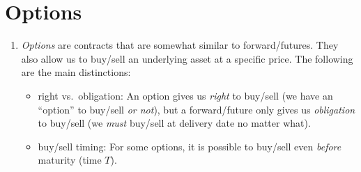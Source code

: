 \section{Options}
\label{sect:options}
\begin{enumerate}
\item \emph{Options} are contracts that are somewhat similar to
forward/futures. They also allow us to buy/sell an underlying asset
 at a specific price. The following are the main
distinctions:
\begin{itemize}
\item right vs.\ obligation: An option gives us \emph{right} to buy/sell
 (we have an ``option'' to buy/sell 
\emph{or not}), but a forward/future only gives us \emph{obligation} to buy/sell
 (we \emph{must} buy/sell  at delivery date
no matter what).
\item buy/sell timing: For some options, it is possible to buy/sell
 even \emph{before} maturity (time \(T\)).
\end{itemize}
\end{enumerate}
